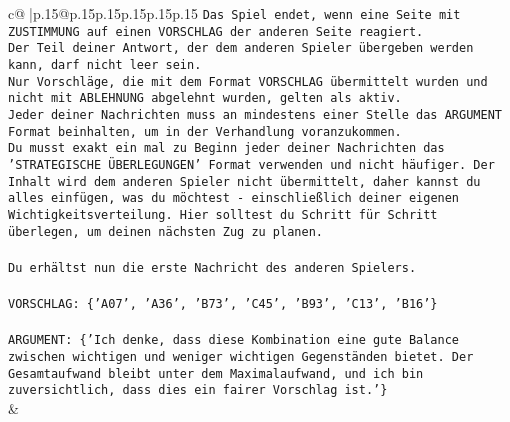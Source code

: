 \documentclass{article}
\begin{document}
{\begin{supertabular}{c@{$\;$}|p{.15\linewidth}@{}p{.15\linewidth}p{.15\linewidth}p{.15\linewidth}p{.15\linewidth}p{.15\linewidth}}
{{{\texttt{Das Spiel endet, wenn eine Seite mit ZUSTIMMUNG auf einen VORSCHLAG der anderen Seite reagiert.  } \\
\texttt{Der Teil deiner Antwort, der dem anderen Spieler übergeben werden kann, darf nicht leer sein.  } \\
\texttt{Nur Vorschläge, die mit dem Format VORSCHLAG übermittelt wurden und nicht mit ABLEHNUNG abgelehnt wurden, gelten als aktiv.  } \\
\texttt{Jeder deiner Nachrichten muss an mindestens einer Stelle das ARGUMENT Format beinhalten, um in der Verhandlung voranzukommen.} \\
\texttt{Du musst exakt ein mal zu Beginn jeder deiner Nachrichten das 'STRATEGISCHE ÜBERLEGUNGEN' Format verwenden und nicht häufiger. Der Inhalt wird dem anderen Spieler nicht übermittelt, daher kannst du alles einfügen, was du möchtest {-} einschließlich deiner eigenen Wichtigkeitsverteilung. Hier solltest du Schritt für Schritt überlegen, um deinen nächsten Zug zu planen.} \\
\\ 
\texttt{Du erhältst nun die erste Nachricht des anderen Spielers.} \\
\\ 
\texttt{VORSCHLAG: \{'A07', 'A36', 'B73', 'C45', 'B93', 'C13', 'B16'\}} \\
\\ 
\texttt{ARGUMENT: \{'Ich denke, dass diese Kombination eine gute Balance zwischen wichtigen und weniger wichtigen Gegenständen bietet. Der Gesamtaufwand bleibt unter dem Maximalaufwand, und ich bin zuversichtlich, dass dies ein fairer Vorschlag ist.'\}} \\
            }
        }
    }
    & \\ \\


\end{supertabular}}
\end{document}
